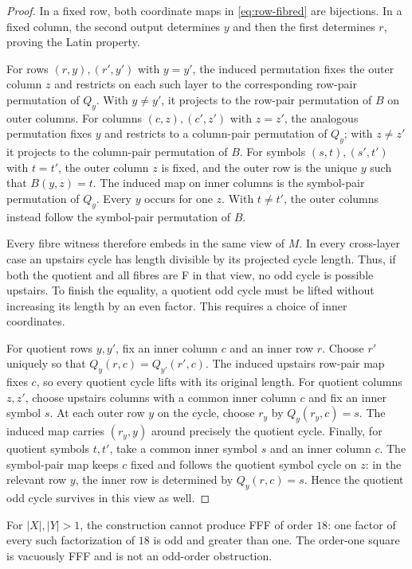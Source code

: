 \begin{proof}
In a fixed row, both coordinate maps in \eqref{eq:row-fibred} are
bijections. In a fixed column, the second output determines $y$ and
then the first determines $r$, proving the Latin property.

For rows $(r,y),(r',y')$ with $y=y'$, the induced permutation fixes
the outer column $z$ and restricts on each such layer to the corresponding
row-pair permutation of $Q_y$. With $y\ne y'$, it projects to the
row-pair permutation of $B$ on outer columns. For columns $(c,z),(c',z')$
with $z=z'$, the analogous permutation fixes $y$ and restricts to a
column-pair permutation of $Q_y$; with $z\ne z'$ it projects to the
column-pair permutation of $B$. For symbols $(s,t),(s',t')$ with
$t=t'$, the outer column $z$ is fixed, and the outer row is the unique
$y$ such that $B(y,z)=t$. The induced map on inner columns is the
symbol-pair permutation of $Q_y$. Every $y$ occurs for one $z$.
With $t\ne t'$, the outer columns instead follow the symbol-pair
permutation of $B$.

Every fibre witness therefore embeds in the same view of $M$. In every
cross-layer case an upstairs cycle has length divisible by its projected
cycle length. Thus, if both the quotient and all fibres are F in that
view, no odd cycle is possible upstairs. To finish the equality, a
quotient odd cycle must be lifted without increasing its length by an
even factor. This requires a choice of inner coordinates.

For quotient rows $y,y'$, fix an inner column $c$ and an inner row $r$.
Choose $r'$ uniquely so that $Q_y(r,c)=Q_{y'}(r',c)$. The induced
upstairs row-pair map fixes $c$, so every quotient cycle lifts with
its original length. For quotient columns $z,z'$, choose upstairs
columns with a common inner column $c$ and fix an inner symbol $s$.
At each outer row $y$ on the cycle, choose $r_y$ by $Q_y(r_y,c)=s$.
The induced map carries $(r_y,y)$ around precisely the quotient
cycle. Finally, for quotient symbols $t,t'$, take a common inner
symbol $s$ and an inner column $c$. The symbol-pair map keeps $c$
fixed and follows the quotient symbol cycle on $z$: in the relevant
row $y$, the inner row is determined by $Q_y(r,c)=s$. Hence the
quotient odd cycle survives in this view as well.
\end{proof}

For $|X|,|Y|>1$, the construction cannot produce FFF of order $18$:
one factor of every such factorization of $18$ is odd and greater
than one. The order-one square is vacuously FFF and is not an odd-order
obstruction.

